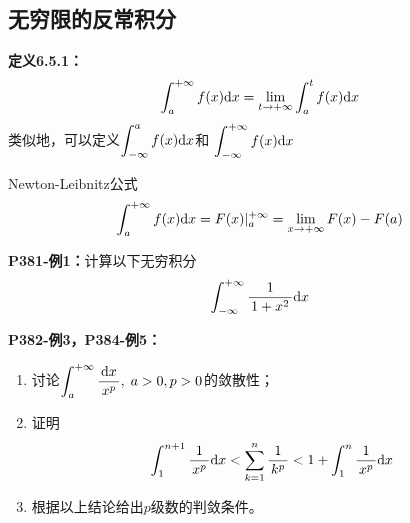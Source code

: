 \subsection{无穷限的反常积分}

{\bf 定义6.5.1：}
$${\displaystyle\int_a^{+\infty}f(x)\mathrm{d} x}
=\lim\limits_{t\to+\infty}\displaystyle\int_a^tf(x)\mathrm{d} x$$
类似地，可以定义${\displaystyle\int_{-\infty}^af(x)\mathrm{d} x}$和
${\displaystyle\int_{-\infty}^{+\infty}f(x)\mathrm{d} x}$

Newton-Leibnitz公式 
  $$\displaystyle\int_a^{+\infty}f(x)\mathrm{d} x=F(x)|_{a}^{+\infty}
  =\lim\limits_{x\to{+\infty}}F(x)-F(a)$$
  
{\bf P381-例1：}计算以下无穷积分
$$\displaystyle\int_{-\infty}^{+\infty}\displaystyle\frac{\,{1}\,}{\,{1+x^2}\,}\mathrm{d} x$$

\begin{center}
\end{center}

{\bf P382-例3，P384-例5：}
\begin{enumerate}[(1)]
  \setlength{\itemindent}{1cm}
  \item 讨论$\displaystyle\int_a^{+\infty}\displaystyle\frac{\,{\mathrm{d} x}\,}{\,{x^p}\,},\;a>0, p>0$的敛散性； 
  \item 证明$$\displaystyle\int_1^{n+1}\displaystyle\frac{\,{1}\,}{\,{x^p}\,}\mathrm{d} x<\sum\limits_{k=1}^n\displaystyle\frac{\,{1}\,}{\,{k^p}\,}
  <1+\displaystyle\int_1^n\displaystyle\frac{\,{1}\,}{\,{x^p}\,}\mathrm{d} x$$ 
  \item 根据以上结论给出$p$级数的判敛条件。
\end{enumerate}

